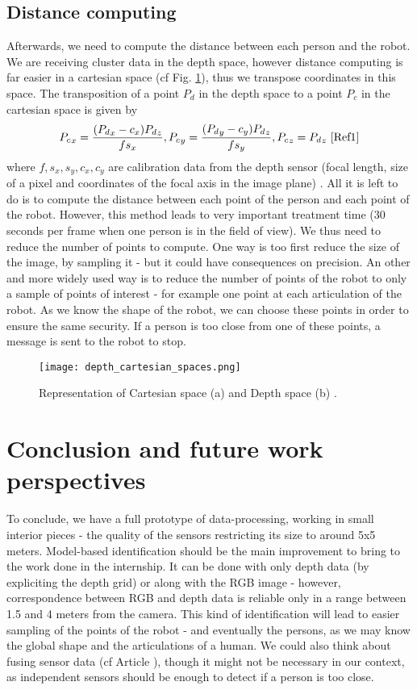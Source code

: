 \documentclass[smallextended]{svjour3}
\begin{document}
\subsection{Distance computing}

Afterwards, we need to compute the distance between each person and the robot. We are receiving cluster data in the depth space, however distance computing is far easier in a cartesian space (cf Fig. \ref{fig:spaces}), thus we transpose coordinates in this space. The transposition of a point $P_d$ in the depth space to a point $P_c$ in the cartesian space is given by \[{P_c}_x = \frac{({P_d}_x-c_x){P_d}_z}{fs_x}, {P_c}_y = \frac{({P_d}_y-c_y){P_d}_z}{fs_y}, {P_c}_z = {P_d}_z \text{ \cite{Ref1}} \]
where $f,s_x,s_y,c_x,c_y$ are calibration data from the depth sensor (focal length, size of a pixel and coordinates of the focal axis in the image plane) \cite{Ref1}.
All it is left to do is to compute the distance between each point of the person and each point of the robot. However, this method leads to very important treatment time (30 seconds per frame when one person is in the field of view). We thus need to reduce the number of points to compute. One way is too first reduce the size of the image, by sampling it - but it could have consequences on precision. An other and more widely used way is to reduce the number of points of the robot to only a sample of points of interest - for example one point at each articulation of the robot. As we know the shape of the robot, we can choose these points in order to ensure the same security. If a person is too close from one of these points, a message is sent to the robot to stop.

\begin{figure}[H]
\centering
\texttt{[image: depth\_cartesian\_spaces.png]}
\caption{\label{fig:spaces}Representation of Cartesian space (a) and Depth space (b) \cite{Ref1}.}
\end{figure}

\section{\label{sect:futurework}Conclusion and future work perspectives}

To conclude, we have a full prototype of data-processing, working in small interior pieces - the quality of the sensors restricting its size to around 5x5 meters.
Model-based identification should be the main improvement to bring to the work done in the internship. It can be done with only depth data (by expliciting the depth grid) or along with the RGB image - however, correspondence between RGB and depth data is reliable only in a range between 1.5 and 4 meters from the camera. This kind of identification will lead to easier sampling of the points of the robot - and eventually the persons, as we may know the global shape and the articulations of a human.
We could also think about fusing sensor data (cf Article \cite{Ref1}), though it might not be necessary in our context, as independent sensors should be enough to detect if a person is too close.
\end{document}
